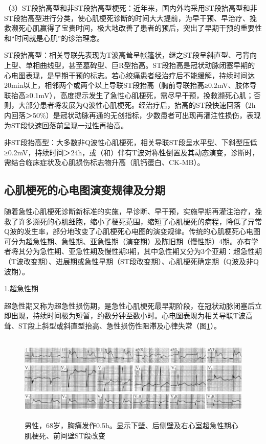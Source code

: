 （3）ST段抬高型和非ST段抬高型梗死：近年来，国内外均采用ST段抬高型和非ST段抬高型进行分类，使心肌梗死诊断的时间大大提前，为早干预、早治疗、挽救濒死心肌赢得了宝贵时间，极大地改善了患者的预后，突出了早期干预的重要性和“时间就是心肌”的诊治理念。

ST段抬高型：相关导联先表现为T波高耸呈帐篷状，继之ST段呈斜直型、弓背向上型、单相曲线型，甚至墓碑型、巨R型抬高。ST段抬高是冠状动脉闭塞早期的心电图表现，是早期干预的标志。若心绞痛患者经治疗后不能缓解，持续时间达20min以上，相邻两个或两个以上导联ST段抬高（胸前导联抬高≥0.2mV、肢体导联抬高≥0.1mV），高度提示发生了急性心肌梗死，需尽早干预，挽救濒死心肌；否则，大部分患者将发展为Q波性心肌梗死。经治疗后，抬高的ST段快速回落（2h内回落＞50\%）是冠状动脉再通的无创指标，少数患者可出现再灌注性损伤，表现为ST段快速回落前呈现一过性再抬高。

非ST段抬高型：大多数非Q波性心肌梗死，相关导联ST段呈水平型、下斜型压低≥0.2mV，持续时间＞24h，或（和）伴有T波对称性倒置及其动态演变，诊断时，需结合临床症状及心肌损伤标志物升高（肌钙蛋白、CK-MB）。

\protect\hypertarget{text00052.htmlux5cux23subid626}{}{}

\subsection{心肌梗死的心电图演变规律及分期}

随着急性心肌梗死诊断新标准的实施，早诊断、早干预，实施早期再灌注治疗，挽救了许多濒死的心肌细胞，缩小了梗死范围，缩短了心肌梗死的病程，降低了异常Q波的发生率，部分地改变了心肌梗死心电图的演变规律。传统的心肌梗死心电图可分为超急性期、急性期、亚急性期（演变期）及陈旧期（慢性期）4期。亦有学者将其分为急性期、亚急性期及慢性期3期，其中急性期又分为3个亚期：超急性期（T波改变期）、进展期或急性早期（ST段改变期）、心肌梗死确定期（Q波及非Q波期）。

1.超急性期

超急性期又称为超急性损伤期，是急性心肌梗死最早期阶段，在冠状动脉闭塞后立即出现，持续时间极为短暂，约数分钟至数小时。心电图表现为相关导联T波高耸、ST段上斜型或斜直型抬高、急性损伤性阻滞及心律失常（图\ref{fig44-7}）。

\begin{figure}[!htbp]
 \centering
 \includegraphics[width=5.79167in,height=1.63542in]{./images/Image00715.jpg}
 \captionsetup{justification=centering}
 \caption{男性，68岁，胸痛发作0.5h。显示下壁、后侧壁及右心室超急性期心肌梗死、前间壁ST段改变}
 \label{fig44-7}
  \end{figure} 

